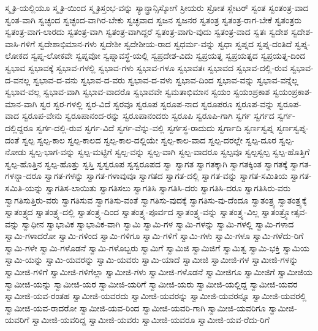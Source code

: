 {ಸ್ಮೃತಿ-ಯಲ್ಲಿಯೂ
ಸ್ಮೃತಿ-ಯಿಂದ
ಸ್ಮೃತಿಸ್ತಂಭ-ವನ್ನು
ಸ್ಯಾನ್ಫ್ರಾನ್ಸಿಸ್ಕೋಗೆ
ಸ್ರೀಯರು
ಸ್ರೋತ
ಸ್ಲೇಟರ್
ಸ್ವಂತ
ಸ್ವಂತಂತ್ರ-ವಾದ
ಸ್ವಂತ-ವಾಗಿ
ಸ್ವಚ್ಛಂದ
ಸ್ವಚ್ಛಂದ-ವಾಗಿರ-ಬೇಕು
ಸ್ವಚ್ಛವಾದ
ಸ್ವಜನ
ಸ್ವಜನರ
ಸ್ವತಂತ್ರ
ಸ್ವತಂತ್ರ-ರಾಗ-ಬೇಕೆ
ಸ್ವತಂತ್ರರು
ಸ್ವತಂತ್ರ-ವಾಗ-ಲಾರದು
ಸ್ವತಂತ್ರ-ವಾಗಿ
ಸ್ವತಂತ್ರ-ವಾಗಿದ್ದರೆ
ಸ್ವತಂತ್ರ-ವಾಗು-ವುದು
ಸ್ವತಂತ್ರ-ವಾದ
ಸ್ವತಃ
ಸ್ವದೇಶ
ಸ್ವದೇಶ-ವಾಸಿ-ಗಳಿಗೆ
ಸ್ವದೇಶಾಭಿಮಾನ-ಗಳು
ಸ್ವದೇಶೀ
ಸ್ವದೇಶೀಯ-ರಾದ
ಸ್ವಧರ್ಮ-ವನ್ನು
ಸ್ವಧಾ
ಸ್ವಪ್ನದ
ಸ್ವಪ್ನ-ದಂತಿದೆ
ಸ್ವಪ್ನ-ಲೋಕದ
ಸ್ವಪ್ನ-ಲೋಕವೇ
ಸ್ವಪ್ನವೋ
ಸ್ವಪ್ನಾವಸ್ಥೆ-ಯಲ್ಲಿ
ಸ್ವಪ್ರದೇಶ-ವಿದು
ಸ್ವಪ್ರಯತ್ನ
ಸ್ವಪ್ರಯತ್ನದ
ಸ್ವಪ್ರಯತ್ನ-ದಿಂದ
ಸ್ವಭಾವ
ಸ್ವಭಾವಕ್ಕೆ
ಸ್ವಭಾವ-ಗಳಲ್ಲಿ
ಸ್ವಭಾವ-ಗಳು
ಸ್ವಭಾವ-ಗಳೂ
ಸ್ವಭಾವತಃ
ಸ್ವಭಾವದ
ಸ್ವಭಾವ-ದಲ್ಲಿ-ರುವ
ಸ್ವಭಾವ-ದ-ವನಲ್ಲ
ಸ್ವಭಾವ-ದ-ವನು
ಸ್ವಭಾವ-ದ-ವರು
ಸ್ವಭಾವ-ದ-ವಳು
ಸ್ವಭಾವ-ದಿಂದ
ಸ್ವಭಾವ-ವನ್ನು
ಸ್ವಭಾವ-ವನ್ನೆಲ್ಲ
ಸ್ವಭಾವ-ವಲ್ಲ
ಸ್ವಭಾವ-ವಾಗಿ
ಸ್ವಭಾವ-ವಾದರೊ
ಸ್ವಭಾವವೇ
ಸ್ವಮತಾಭಿಮಾನ
ಸ್ವಯಂ
ಸ್ವಯಂಪ್ರಕಾಶ
ಸ್ವಯಂಪ್ರಕಾಶ-ಮಾನ-ವಾಗಿ
ಸ್ವರ
ಸ್ವರ-ಗಳಲ್ಲಿ
ಸ್ವರ-ವಿದೆ
ಸ್ವರವೂ
ಸ್ವರೂಪ
ಸ್ವರೂಪ-ನಾದ
ಸ್ವರೂಪರೂ
ಸ್ವರೂಪ-ವನ್ನು
ಸ್ವರೂಪ-ವಾದ
ಸ್ವರೂಪ-ವೇನು
ಸ್ವರೂಪಾನಂದ-ರನ್ನು
ಸ್ವರೂಪಾನಂದರು
ಸ್ವರೂಪಿ
ಸ್ವರೂಪಿ-ಗಾಗಿ
ಸ್ವರ್ಗ
ಸ್ವರ್ಗದ
ಸ್ವರ್ಗ-ದಲ್ಲಿದ್ದರೂ
ಸ್ವರ್ಗ-ದಲ್ಲಿ-ರುವ
ಸ್ವರ್ಗ-ವಿದೆ
ಸ್ವರ್ಗ-ವೆನ್ನು-ವಲ್ಲಿ
ಸ್ವರ್ಗಸ್ಥ-ರಾದುದು
ಸ್ವರ್ಗಾದಿ
ಸ್ವರ್ಣಸ್ವಪ್ನ
ಸ್ವರ್ಣಸ್ವಪ್ನ-ದಂತೆ
ಸ್ವಲ್ಪ
ಸ್ವಲ್ಪ-ಕಾಲ
ಸ್ವಲ್ಪ-ಕಾಲದ
ಸ್ವಲ್ಪ-ಕಾಲ-ದಲ್ಲಿಯೇ
ಸ್ವಲ್ಪ-ಕಾಲ-ವಾದ
ಸ್ವಲ್ಪ-ದರಲ್ಲೇ
ಸ್ವಲ್ಪ-ದೂರ
ಸ್ವಲ್ಪ-ನೋಡು
ಸ್ವಲ್ಪ-ಭಾಗ-ವನ್ನು
ಸ್ವಲ್ಪ-ಮಟ್ಟಿಗೆ
ಸ್ವಲ್ಪ-ವನ್ನು
ಸ್ವಲ್ಪ-ವಾಗಿ
ಸ್ವಲ್ಪ-ವಾದರೂ
ಸ್ವಲ್ಪವೂ
ಸ್ವಲ್ಪಸ್ವಲ್ಪ
ಸ್ವಲ್ಪ-ಹೊತ್ತಿಗೆ
ಸ್ವಲ್ಪ-ಹೊತ್ತಿನ
ಸ್ವಲ್ಪ-ಹೊತ್ತು
ಸ್ವಸ್ತಿ
ಸ್ವಸ್ವರೂಪ
ಸ್ವಸ್ವರೂಪದ
ಸ್ವಾ
ಸ್ವಾಗತ
ಸ್ವಾಗತಕ್ಕಾಗಿ
ಸ್ವಾಗತಕ್ಕಿಂತ
ಸ್ವಾಗತಕ್ಕೆ
ಸ್ವಾಗತ-ಗಳನ್ನಾ-ದರೂ
ಸ್ವಾಗತ-ಗಳನ್ನು
ಸ್ವಾಗತ-ಗಳಾವುವೂ
ಸ್ವಾಗತದ
ಸ್ವಾಗತ-ದಲ್ಲಿ
ಸ್ವಾಗತ-ವನ್ನು
ಸ್ವಾಗತ-ಸಮಿತಿಯ
ಸ್ವಾಗತ-ಸಮಿತಿ-ಯನ್ನು
ಸ್ವಾಗತಿಸ-ಲಾಯಿತು
ಸ್ವಾಗತಿಸಲು
ಸ್ವಾಗತಿಸಿ
ಸ್ವಾಗತಿಸಿ-ದರು
ಸ್ವಾಗತಿಸಿ-ದರೂ
ಸ್ವಾಗತಿಸಿರು-ವರು
ಸ್ವಾಗತಿಸುತ್ತಿರು-ವರು
ಸ್ವಾಗತಿಸುವ
ಸ್ವಾಗತಿಸು-ವಂತೆ
ಸ್ವಾಗತಿಸು-ವುದಕ್ಕೆ
ಸ್ವಾಗತಿಸು-ವು-ದೆಂದೂ
ಸ್ವಾತಂತ್ರ್ಯ
ಸ್ವಾತಂತ್ರ್ಯಕ್ಕೆ
ಸ್ವಾತಂತ್ರ್ಯದ
ಸ್ವಾತಂತ್ರ್ಯ-ದಲ್ಲಿ
ಸ್ವಾತಂತ್ರ್ಯ-ದಿಂದ
ಸ್ವಾತಂತ್ರ್ಯ-ಪೂರ್ವದ
ಸ್ವಾತಂತ್ರ್ಯ-ವನ್ನು
ಸ್ವಾತಂತ್ರ್ಯ-ವಿಲ್ಲ
ಸ್ವಾತಂತ್ರ್ಯೋತ್ಸವ-ವನ್ನು
ಸ್ವಾಧೀನ
ಸ್ವಾಭಾವಿಕ
ಸ್ವಾಭಾವಿಕ-ವಾಗಿ
ಸ್ವಾಮಿ
ಸ್ವಾಮಿ-ಗಳ
ಸ್ವಾಮಿ-ಗಳನ್ನು
ಸ್ವಾಮಿ-ಗಳಲ್ಲಿ
ಸ್ವಾಮಿ-ಗಳಾದ
ಸ್ವಾಮಿ-ಗಳಾದರೋ
ಸ್ವಾಮಿ-ಗಳಿಂದ
ಸ್ವಾಮಿ-ಗಳಿಗೂ
ಸ್ವಾಮಿ-ಗಳಿಗೆ
ಸ್ವಾಮಿ-ಗಳು
ಸ್ವಾಮಿ-ಗಳೂ
ಸ್ವಾಮಿ-ಗಳೆದು-ರಿಗೆ
ಸ್ವಾಮಿ-ಗಳೇ
ಸ್ವಾಮಿ-ಗಳೊಡನೆ
ಸ್ವಾಮಿ-ಗಳೊಬ್ಬರು
ಸ್ವಾಮಿಗೆ
ಸ್ವಾಮಿಜಿ
ಸ್ವಾಮಿಜಿಗೆ
ಸ್ವಾಮಿತ್ವ
ಸ್ವಾಮಿ-ಭಕ್ತಿ
ಸ್ವಾಮಿಯ
ಸ್ವಾಮಿ-ಯನ್ನು
ಸ್ವಾಮಿ-ಯವರನ್ನು
ಸ್ವಾಮಿ-ಯವರು
ಸ್ವಾಮಿ-ಯಾದೆ
ಸ್ವಾಮೀಜಿ
ಸ್ವಾಮೀಜಿ-ಗಳ
ಸ್ವಾಮೀಜಿ-ಗಳನ್ನು
ಸ್ವಾಮೀಜಿ-ಗಳಿಗೆ
ಸ್ವಾಮೀಜಿ-ಗಳಿಗೆಲ್ಲಾ
ಸ್ವಾಮೀಜಿ-ಗಳು
ಸ್ವಾಮೀಜಿ-ಗಳೊಡನೆ
ಸ್ವಾಮೀಜಿಗೂ
ಸ್ವಾಮೀಜಿಗೆ
ಸ್ವಾಮೀಜಿಯ
ಸ್ವಾಮೀಜಿ-ಯನ್ನು
ಸ್ವಾಮೀಜಿ-ಯರ
ಸ್ವಾಮೀಜಿ-ಯರಿಗೆ
ಸ್ವಾಮೀಜಿ-ಯರು
ಸ್ವಾಮೀಜಿ-ಯಲ್ಲಿದ್ದ
ಸ್ವಾಮೀಜಿ-ಯವರ
ಸ್ವಾಮೀಜಿ-ಯವ-ರಂತಹ
ಸ್ವಾಮೀಜಿ-ಯವರದು
ಸ್ವಾಮೀಜಿ-ಯವರನ್ನು
ಸ್ವಾಮೀಜಿ-ಯವರನ್ನೂ
ಸ್ವಾಮೀಜಿ-ಯವರಲ್ಲಿ
ಸ್ವಾಮೀಜಿ-ಯವ-ರಾದರೋ
ಸ್ವಾಮೀಜಿ-ಯವ-ರಿಂದ
ಸ್ವಾಮೀಜಿ-ಯವರಿ-ಗಾಗಿ
ಸ್ವಾಮೀಜಿ-ಯವರಿಗೂ
ಸ್ವಾಮೀಜಿ-ಯವರಿಗೆ
ಸ್ವಾಮೀಜಿ-ಯವರಿದ್ದ
ಸ್ವಾಮೀಜಿ-ಯವರು
ಸ್ವಾಮೀಜಿ-ಯವರೂ
ಸ್ವಾಮೀಜಿ-ಯವ-ರೆದು-ರಿಗೆ
}
